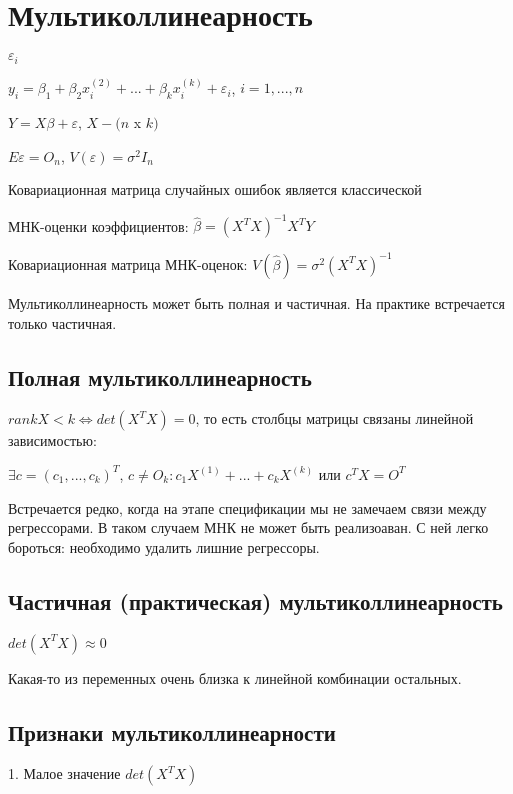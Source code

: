 \documentclass{article}
\begin{document}
\section{Мультиколлинеарность} 
$\varepsilon_i$\par 
$y_i = \beta_1 + \beta_2x_i^{(2)} + ... + \beta_kx_i^{(k)} + \varepsilon_i$, $i = 1, ... , n$\par 
$Y = X\beta + \varepsilon$, $X - (n$ x $k)$\par 
$E\varepsilon = O_n$, $V(\varepsilon) = \sigma^2I_n$\par 

\vspace{2mm}
Ковариационная матрица случайных ошибок является классической\par 
МНК-оценки коэффициентов: $\hat{\beta} = (X^TX)^{-1}X^TY$\par 
Ковариационная матрица МНК-оценок: $V(\hat{\beta}) = \sigma^2(X^TX)^{-1}$\par 

\vspace{2mm}
Мультиколлинеарность может быть полная и частичная. На практике встречается только частичная.\par 



\subsection{Полная мультиколлинеарность}
$rank X < k \Longleftrightarrow det(X^TX) = 0$, то есть столбцы матрицы связаны линейной зависимостью: \par 
$\exists c = (c_1, ... , c_k)^T$, $c \neq O_k:
c_1X^{(1)} + ... + c_kX^{(k)}$ или $c^TX = O^T$

\vspace{2mm}
Встречается редко, когда на этапе спецификации мы не замечаем связи между регрессорами. В таком случаем МНК не может быть реализоаван. С ней легко бороться: необходимо удалить лишние регрессоры.

\subsection{Частичная (практическая) мультиколлинеарность}
$det(X^TX) \approx 0$ \par
Какая-то из переменных очень близка к линейной комбинации остальных.

\subsection{Признаки мультиколлинеарности}
1. Малое значение $det(X^TX)$ \par
\end{document}
